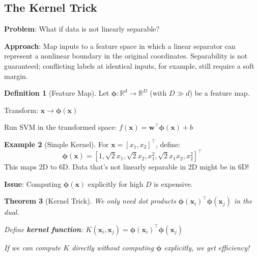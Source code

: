 \documentclass[11pt,twoside]{article}
\numberwithin{equation}{section}
\newcommand{\R}{\mathbb{R}}
\newcommand{\vect}[1]{\bm{#1}}
\theoremstyle{plain}
\newtheorem{theorem}{Theorem}[section]
\theoremstyle{definition}
\newtheorem{definition}[theorem]{Definition}
\newtheorem{example}[theorem]{Example}
\theoremstyle{remark}
\begin{document}
\subsection{The Kernel Trick}

\textbf{Problem}: What if data is not linearly separable?

\textbf{Approach}: Map inputs to a feature space in which a linear separator can represent a nonlinear boundary in the original coordinates. Separability is not guaranteed; conflicting labels at identical inputs, for example, still require a soft margin.

\begin{definition}[Feature Map]
Let $\vect{\phi}: \R^d \to \R^D$ (with $D \gg d$) be a feature map.

Transform: $\vect{x} \to \vect{\phi}(\vect{x})$

Run SVM in the transformed space: $f(\vect{x}) = \vect{w}^\top\vect{\phi}(\vect{x}) + b$
\end{definition}

\begin{example}[Simple Kernel]
For $\vect{x} = [x_1, x_2]^\top$, define:
\[
\vect{\phi}(\vect{x}) = [1, \sqrt{2}x_1, \sqrt{2}x_2, x_1^2, \sqrt{2}x_1x_2, x_2^2]^\top
\]
This maps 2D to 6D. Data that's not linearly separable in 2D might be in 6D!
\end{example}

\textbf{Issue}: Computing $\vect{\phi}(\vect{x})$ explicitly for high $D$ is expensive.

\begin{theorem}[Kernel Trick]
We only need dot products $\vect{\phi}(\vect{x}_i)^\top\vect{\phi}(\vect{x}_j)$ in the dual.

Define \textbf{kernel function}: $K(\vect{x}_i, \vect{x}_j) = \vect{\phi}(\vect{x}_i)^\top\vect{\phi}(\vect{x}_j)$

If we can compute $K$ directly without computing $\vect{\phi}$ explicitly, we get efficiency!
\end{theorem}
\end{document}
